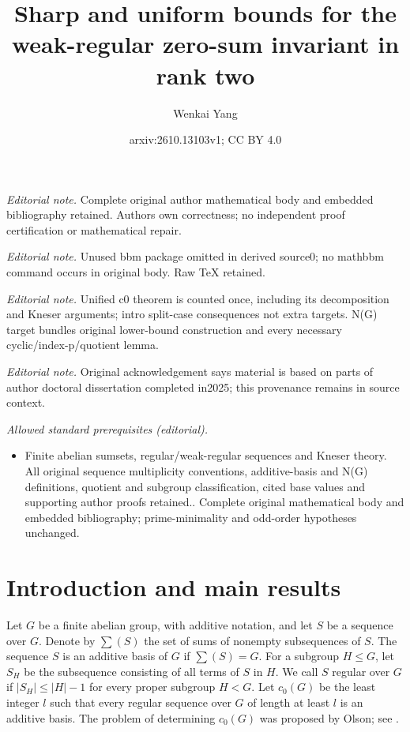 \documentclass[10pt,a4paper]{amsart}
\title{Sharp and uniform bounds for the weak-regular zero-sum invariant in rank two}
\author{Wenkai Yang}
\date{arxiv:2610.13103v1; CC BY 4.0}
\theoremstyle{definition}
\theoremstyle{remark}
\numberwithin{equation}{section}
\begin{document}
\maketitle
\noindent\textit{Editorial note.} Complete original author mathematical body and embedded bibliography retained. Authors own correctness; no independent proof certification or mathematical repair.\par\medskip
\noindent\textit{Editorial note.} Unused bbm package omitted in derived source0; no mathbbm command occurs in original body. Raw TeX retained.\par\medskip
\noindent\textit{Editorial note.} Unified c0 theorem is counted once, including its decomposition and Kneser arguments; intro split-case consequences not extra targets. N(G) target bundles original lower-bound construction and every necessary cyclic/index-p/quotient lemma.\par\medskip
\noindent\textit{Editorial note.} Original acknowledgement says material is based on parts of author doctoral dissertation completed in2025; this provenance remains in source context.\par\medskip
\noindent\textit{Allowed standard prerequisites (editorial).}\begin{itemize}
\item Finite abelian sumsets, regular/weak-regular sequences and Kneser theory. All original sequence multiplicity conventions, additive-basis and N(G) definitions, quotient and subgroup classification, cited base values and supporting author proofs retained.. Complete original mathematical body and embedded bibliography; prime-minimality and odd-order hypotheses unchanged.
\end{itemize}\medskip
\section{Introduction and main results}

Let $G$ be a finite abelian group, with additive notation, and let $S$ be
a sequence over $G$. Denote by $\sum(S)$ the set of sums of nonempty
subsequences of $S$. The sequence $S$ is an additive basis of $G$ if
$\sum(S)=G$. For a subgroup $H\le G$, let $S_H$ be the subsequence
consisting of all terms of $S$ in $H$. We call $S$ regular over $G$ if
$|S_H|\le |H|-1$ for every proper subgroup $H<G$.
Let $c_0(G)$ be the least integer $l$ such that every regular sequence
over $G$ of length at least $l$ is an additive basis.
The problem of determining $c_0(G)$ was proposed by Olson;
see \cite{[GHQQZ2015],[GQZ2020]}.
\end{document}
